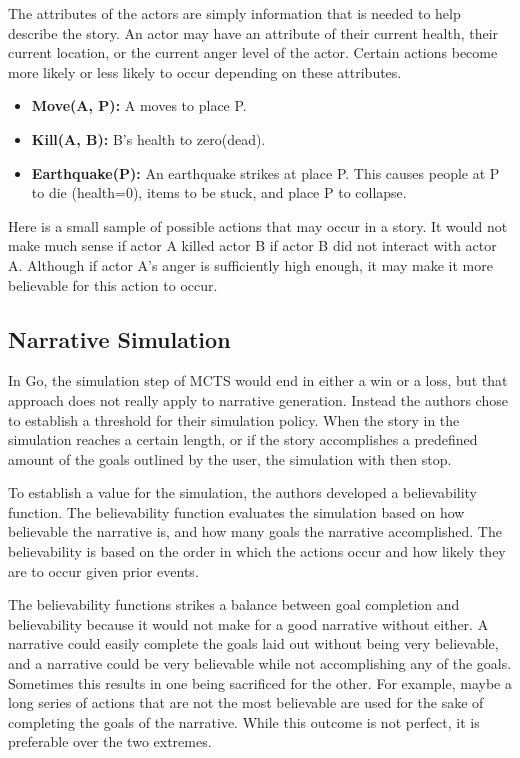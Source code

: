 \documentclass{sig-alternate}
\begin{document}
The attributes of the actors are simply information that is needed to help describe the story. An actor may have an attribute of their current health, their current location, or the  current anger level of the actor. Certain actions become more likely or less likely to occur depending on these attributes.

\begin{itemize}
\item \textbf{Move(A, P):} A moves to place P.
\item \textbf{Kill(A, B):} B's health to zero(dead).
\item \textbf{Earthquake(P):} An earthquake strikes at place P. This causes people at P to die (health=0), items to be stuck, and place P to collapse.
\end{itemize}

Here is a small sample of possible actions that may occur in a story. It would not make much sense if actor A killed actor B if actor B did not interact with actor A. Although if actor A's anger is sufficiently high enough, it may make it more believable for this action to occur\cite{Narrative}.

\subsection{Narrative Simulation}
In Go, the simulation step of MCTS would end in either a win or a loss, but that approach does not really apply to narrative generation. Instead the authors chose to establish a threshold for their simulation policy. When the story in the simulation reaches a certain length, or if the story accomplishes a predefined amount of the goals outlined by the user, the simulation with then stop.

To establish a value for the simulation, the authors developed a believability function. The believability function evaluates the simulation based on how believable the narrative is, and how many goals the narrative accomplished. The believability is based on the order in which the actions occur and how likely they are to occur given prior events.

The believability functions strikes a balance between goal completion and believability because it would not make for a good narrative without either. A narrative could easily complete the goals laid out without being very believable, and a narrative could be very believable while not accomplishing any of the goals. Sometimes this results in one being sacrificed for the other. For example, maybe a long series of actions that are not the most believable are used for the sake of completing the goals of the narrative. While this outcome is not perfect, it is preferable over the two extremes.
\end{document}
